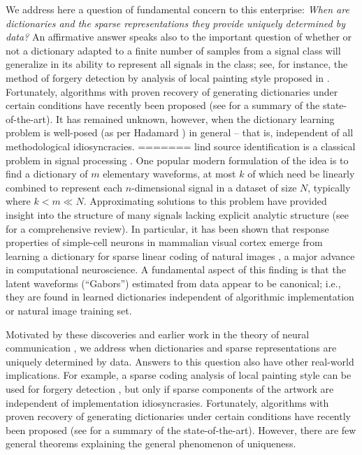 \documentclass[9pt,twocolumn]{pnas-new}
\begin{document}
We address here a question of fundamental concern to this enterprise: \emph{When are dictionaries and the sparse representations they provide uniquely determined by data?} An affirmative answer speaks also to the important question of whether or not a dictionary adapted to a finite number of samples from a signal class will generalize in its ability to represent all signals in the class; see, for instance, the method of forgery detection by analysis of local painting style proposed in \cite{hughes2010, Olshausen10}. Fortunately, algorithms with proven recovery of generating dictionaries under certain conditions have recently been proposed (see \cite[Sec.~I-E]{Sun16} for a summary of the state-of-the-art). It has remained unknown, however, when the dictionary learning problem is well-posed (as per Hadamard \cite{Hadamard1902}) in general -- that is, independent of all methodological idiosyncracies.
=======
lind source identification is a classical problem in signal processing \cite{sato1975method}.  
One popular modern formulation of the idea is to find a dictionary of $m$ elementary waveforms, at most $k$ of which need be linearly combined to represent each $n$-dimensional signal in a dataset of size $N$, typically where $k < m \ll N$.  Approximating solutions to this problem have
provided insight into the structure of many signals lacking explicit analytic structure (see \cite{Zhang15} for a comprehensive review). 
In particular, it has been shown that response properties of simple-cell neurons in mammalian visual cortex emerge from learning a dictionary for sparse linear coding of natural images \cite{Olshausen96, hurri1996image, bell1997independent, van1998independent}, a major advance in computational neuroscience. A fundamental aspect of this finding is that the latent waveforms (``Gabors'') estimated from data appear to be canonical; i.e., they are found in learned dictionaries independent of algorithmic implementation or natural image training set.


Motivated by these discoveries and earlier work in the theory of neural communication \cite{Coulter10, Isely10}, we address when dictionaries and sparse representations are uniquely determined by data.  Answers to this question also have other real-world implications.  For example, a sparse coding analysis of local painting style can be used for forgery detection \cite{hughes2010, Olshausen10}, but only if sparse components of the artwork are independent of implementation idiosyncrasies. Fortunately, algorithms with proven recovery of generating dictionaries under certain 
conditions have recently been proposed (see \cite[Sec.~I-E]{Sun16} for a summary of the state-of-the-art).  However,
there are few general theorems explaining the general phenomenon of uniqueness.  
\end{document}
